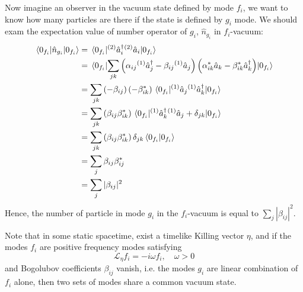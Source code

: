 \documentclass[12pt]{article}
\numberwithin{equation}{section}
\theoremstyle{1style}
\begin{document}
Now imagine an observer in the vacuum state defined by mode \(f_i\), we want to know how many particles are there if the state is defined by \(g_i\) mode.
We should exam the expectation value of number operator of \(g_i\), \(\hat{n}_{g_i}\) in \(f_i\)-vacuum:
\begin{align}
  \expval{\hat{n}_{g_i}}{0_{f_i}} & =\expval{{}^{(2)}\hat{{a}}_i^\dagger {}^{(2)}\hat{{a}}_i}{0_{f_i}}                                                                                                     \\
                                  & =\expval{\sum_{jk}\left(\alpha_{ij}{}^{(1)}\hat{a}^{\dagger}_j-\beta_{ij}{}^{(1)}\hat{a}_j\right)\left(\alpha^*_{ik}\hat{a}_k-\beta^*_{ik}\hat{a}^{\dagger}_k\right)}{0_{f_i}} \\
                                  & =\sum_{jk}\left(-\beta_{ij}\right)\left(-\beta^*_{ik}\right)\expval{{}^{(1)}\hat{a}_j{}^{(1)}\hat{a}^{\dagger}_k}{0_{f_i}}                                                     \\
                                  & =\sum_{jk}\left(\beta_{ij}\beta^*_{ik}\right)\expval{{}^{(1)}\hat{a}^{\dagger}_k{}^{(1)}\hat{a}_j+\delta_{jk}}{0_{f_i}}                                                        \\
                                  & =\sum_{jk}\left(\beta_{ij}\beta^*_{ik}\right)\delta_{jk}\braket{0_{f_i}}{0_{f_i}}                                                                              \\
                                  & =\sum_{j}\beta_{ij}\beta^*_{ij}                                                                                                                                \\
                                  & =\sum_{j}|\beta_{ij}|^2
\end{align}
Hence, the number of particle in mode \(g_i\) in the \(f_i\)-vacuum is equal to \(\sum_{j}|\beta_{ij}|^2\).

Note that in some static spacetime, exist a timelike Killing vector \(\eta\), and if the modes \(f_i\) are positive frequency
modes satisfying
\begin{equation}
  \mathcal{L}_{\eta}f_i=-i\omega f_i,\quad \omega>0
\end{equation}
and Bogolubov coefficients \(\beta_{ij}\) vanish, i.e. the modes \(g_i\) are linear combination of \(f_i\) alone,
then two sets of modes share a common vacuum state.
\end{document}
